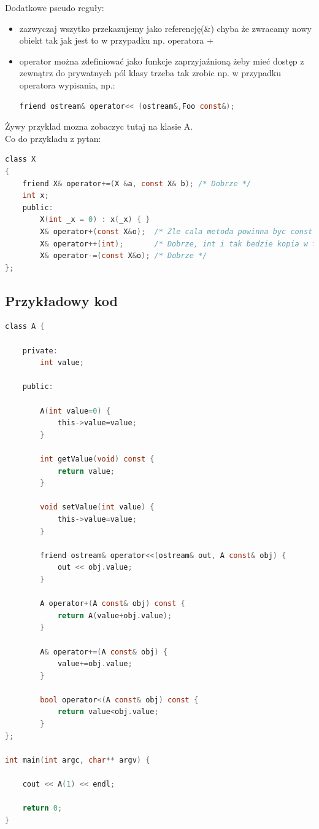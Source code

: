 Dodatkowe pseudo reguły:
\begin{itemize}
	\item zazwyczaj wszytko przekazujemy jako referencję(\&) chyba że zwracamy nowy obiekt tak jak jest to w przypadku np. operatora +
	\item operator można zdefiniować jako funkcje zaprzyjaźnioną żeby mieć dostęp z zewnątrz do prywatnych pól klasy trzeba tak zrobic np. w przypadku operatora wypisania, np.:
		\begin{lstlisting}[language=c]
	friend ostream& operator<< (ostream&,Foo const&);
		\end{lstlisting}
	\end{itemize}
	
Żywy przyklad mozna zobaczyc tutaj na klasie A.\\

Co do przykladu z pytan:\\
\begin{lstlisting}[language=c]
class X
{
	friend X& operator+=(X &a, const X& b); /* Dobrze */
	int x;
	public:
		X(int _x = 0) : x(_x) { }
		X& operator+(const X&o);  /* Zle cala metoda powinna byc const */
		X& operator++(int);       /* Dobrze, int i tak bedzie kopia w funkcji */
		X& operator-=(const X&o); /* Dobrze */
};
\end{lstlisting}

\subsection{Przykładowy kod}
\begin{lstlisting}[language=c]
class A {
	
	private:
		int value;
	
	public:
		
		A(int value=0) {
			this->value=value;
		}
		
		int getValue(void) const {
			return value;
		}
		
		void setValue(int value) {
			this->value=value;
		}
		
		friend ostream& operator<<(ostream& out, A const& obj) {
			out << obj.value;
		}
		
		A operator+(A const& obj) const {
			return A(value+obj.value);
		}
		
		A& operator+=(A const& obj) {
			value+=obj.value;
		}
		
		bool operator<(A const& obj) const {
			return value<obj.value;
		}
};

int main(int argc, char** argv) {
	
	cout << A(1) << endl;
	
	return 0;
}
\end{lstlisting}

